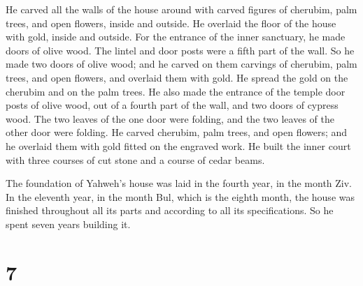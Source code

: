  He carved all the walls of the house around with carved
figures of cherubim, palm trees, and open flowers, inside and outside.
 He overlaid the floor of the house with gold, inside and
outside.  For the entrance of the inner sanctuary, he
made doors of olive wood. The lintel and door posts were a fifth part of
the wall.  So he made two doors of olive wood; and he
carved on them carvings of cherubim, palm trees, and open flowers, and
overlaid them with gold. He spread the gold on the cherubim and on the
palm trees.  He also made the entrance of the temple door
posts of olive wood, out of a fourth part of the wall, 
and two doors of cypress wood. The two leaves of the one door were
folding, and the two leaves of the other door were folding.
 He carved cherubim, palm trees, and open flowers; and he
overlaid them with gold fitted on the engraved work.  He
built the inner court with three courses of cut stone and a course of
cedar beams.

 The foundation of Yahweh's house was laid in the fourth
year, in the month Ziv.  In the eleventh year, in the
month Bul, which is the eighth month, the house was finished throughout
all its parts and according to all its specifications. So he spent seven
years building it.

\hypertarget{section-6}{%
\section{7}\label{section-6}}

